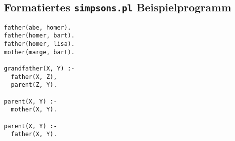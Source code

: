 \documentclass[parskip=full,11pt,twoside]{scrartcl}
\begin{document}
\subsection{Formatiertes \texttt{simpsons.pl} Beispielprogramm}

\begin{lstlisting}
father(abe, homer).
father(homer, bart).
father(homer, lisa).
mother(marge, bart).

grandfather(X, Y) :-
  father(X, Z),
  parent(Z, Y).

parent(X, Y) :-
  mother(X, Y).

parent(X, Y) :-
  father(X, Y).
\end{lstlisting}
\end{document}
